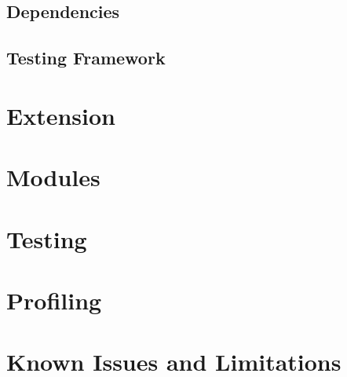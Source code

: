 \documentclass[11pt]{article}
\begin{document}
\subsection{Dependencies}


\subsection{Testing Framework}


\section{Extension}


\section{Modules}


\section{Testing}


\section{Profiling}


\section{Known Issues and Limitations}

\end{document}
